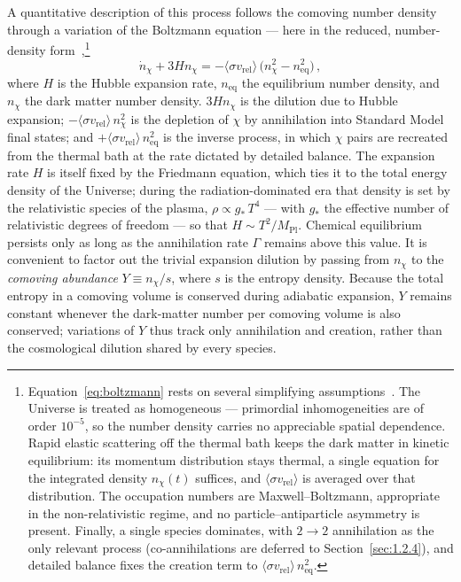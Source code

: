 A quantitative description of this process follows the comoving number density through a variation of the Boltzmann equation --- here in the reduced, number-density form~\cite{Gondolo:1990dk,Cirelli:2024ssz},\footnote{Equation~\eqref{eq:boltzmann} rests on several simplifying assumptions~\cite{Gondolo:1990dk,Cirelli:2024ssz}. The Universe is treated as homogeneous --- primordial inhomogeneities are of order $10^{-5}$, so the number density carries no appreciable spatial dependence. Rapid elastic scattering off the thermal bath keeps the dark matter in kinetic equilibrium: its momentum distribution stays thermal, a single equation for the integrated density $n_\chi(t)$ suffices, and $\langle \sigma v_\mathrm{rel}\rangle$ is averaged over that distribution. The occupation numbers are Maxwell--Boltzmann, appropriate in the non-relativistic regime, and no particle--antiparticle asymmetry is present. Finally, a single species dominates, with $2\to 2$ annihilation as the only relevant process (co-annihilations are deferred to Section~\ref{sec:1.2.4}), and detailed balance fixes the creation term to $\langle \sigma v_\mathrm{rel}\rangle\, n_\mathrm{eq}^2$.}
\begin{equation}
	\dot n_\chi + 3 H n_\chi = -\langle \sigma v_\mathrm{rel} \rangle\, \bigl( n_\chi^2 - n_\mathrm{eq}^2 \bigr)\,,
	\label{eq:boltzmann}
\end{equation}
where $H$ is the Hubble expansion rate, $n_\mathrm{eq}$ the equilibrium number density, and $n_\chi$ the dark matter number density.
$3 H n_\chi$ is the dilution due to Hubble expansion;  $-\langle \sigma v_\mathrm{rel}\rangle\, n_\chi^2$ is the depletion of $\chi$ by annihilation into Standard Model final states; and $+\langle \sigma v_\mathrm{rel}\rangle\, n_\mathrm{eq}^2$ is the inverse process, in which $\chi$ pairs are recreated from the thermal bath at the rate dictated by detailed balance.
The expansion rate $H$ is itself fixed by the Friedmann equation, which ties it to the total energy density of the Universe; during the radiation-dominated era that density is set by the relativistic species of the plasma, $\rho \propto g_*\, T^4$ --- with $g_*$ the effective number of relativistic degrees of freedom --- so that $H \sim T^2/M_\mathrm{Pl}$.
Chemical equilibrium persists only as long as the annihilation rate $\Gamma$ remains above this value.
It is convenient to factor out the trivial expansion dilution by passing from $n_\chi$ to the \emph{comoving abundance} $Y \equiv n_\chi / s$, where $s$ is the entropy density.
Because the total entropy in a comoving volume is conserved during adiabatic expansion, $Y$ remains constant whenever the dark-matter number per comoving volume is also conserved; variations of $Y$ thus track only annihilation and creation, rather than the cosmological dilution shared by every species.
